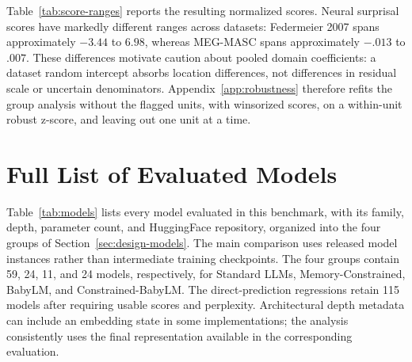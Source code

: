 Table~\ref{tab:score-ranges} reports the resulting normalized scores. Neural surprisal scores have markedly different ranges across datasets: Federmeier 2007 spans approximately $-3.44$ to $6.98$, whereas MEG-MASC spans approximately $-.013$ to $.007$. These differences motivate caution about pooled domain coefficients: a dataset random intercept absorbs location differences, not differences in residual scale or uncertain denominators. Appendix~\ref{app:robustness} therefore refits the group analysis without the flagged units, with winsorized scores, on a within-unit robust z-score, and leaving out one unit at a time.







\section{Full List of Evaluated Models}
\label{app:models}

Table~\ref{tab:models} lists every model evaluated in this benchmark, with its family, depth, parameter count, and HuggingFace repository, organized into the four groups of Section~\ref{sec:design-models}. The main comparison uses released model instances rather than intermediate training checkpoints. The four groups contain 59, 24, 11, and 24 models, respectively, for Standard LLMs, Memory-Constrained, BabyLM, and Constrained-BabyLM. The direct-prediction regressions retain 115 models after requiring usable scores and perplexity. Architectural depth metadata can include an embedding state in some implementations; the analysis consistently uses the final representation available in the corresponding evaluation.

